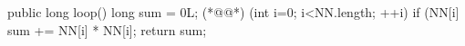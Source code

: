 
\begin{ffcode}
public long loop() {
  long sum = 0L;
  (*@@*) (int i=0; i<NN.length; ++i)
    if (NN[i] %
      sum += NN[i] * NN[i];
  return sum; }
\end{ffcode}
